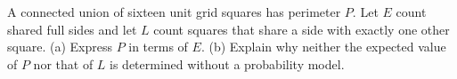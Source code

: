 A connected union of sixteen unit grid squares has perimeter $P$. Let $E$ count shared full sides and let $L$ count squares that share a side with exactly one other square. (a) Express $P$ in terms of $E$. (b) Explain why neither the expected value of $P$ nor that of $L$ is determined without a probability model.

